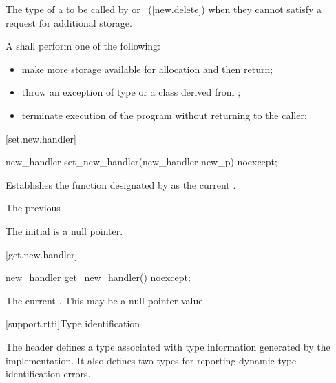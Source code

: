 \begin{itemdescr}
\pnum
The type of a
to be called by
or
~(\ref{new.delete}) when they cannot satisfy a request for additional storage.

\pnum
\required
A  shall perform one of the following:

\begin{itemize}
\item
make more storage available for allocation and then return;
\item
throw an exception of type
or a class derived from
%
;
\item
terminate execution of the program without returning to the caller;
%
%
\end{itemize}
\end{itemdescr}

[set.new.handler]{}

%
\begin{itemdecl}
new_handler set_new_handler(new_handler new_p) noexcept;
\end{itemdecl}

\begin{itemdescr}
\pnum
\effects
Establishes the function designated by  as the current
.

\pnum
\returns
The previous .

\pnum
\remarks
The initial  is a null pointer.
\end{itemdescr}

[get.new.handler]{}

\begin{itemdecl}
new_handler get_new_handler() noexcept;
\end{itemdecl}

\begin{itemdescr}
\pnum
\returns The current .
\enternote This may be a null pointer value. \exitnote
\end{itemdescr}

[support.rtti]{Type identification}

\pnum
The header
defines a
type associated with type information generated by the implementation.
It also defines two types for reporting dynamic type identification errors.

